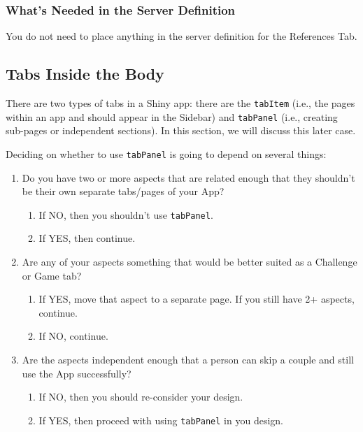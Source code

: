 \documentclass[
]{book}
\providecommand{\tightlist}{%
  \setlength{\itemsep}{0pt}\setlength{\parskip}{0pt}}
\begin{document}
\hypertarget{whats-needed-in-the-server-definition-7}{%
\subsubsection{What's Needed in the Server Definition}\label{whats-needed-in-the-server-definition-7}}

You do not need to place anything in the server definition for the References Tab.

\hypertarget{innerTabsb}{%
\subsection{Tabs Inside the Body}\label{innerTabsb}}

There are two types of tabs in a Shiny app: there are the \texttt{tabItem} (i.e., the pages within an app and should appear in the Sidebar) and \texttt{tabPanel} (i.e., creating sub-pages or independent sections). In this section, we will discuss this later case.

Deciding on whether to use \texttt{tabPanel} is going to depend on several things:

\begin{enumerate}
\def\labelenumi{\arabic{enumi}.}
\tightlist
\item
  Do you have two or more aspects that are related enough that they shouldn't be their own separate tabs/pages of your App?

  \begin{enumerate}
  \def\labelenumii{\alph{enumii}.}
  \tightlist
  \item
    If NO, then you shouldn't use \texttt{tabPanel}.\\
  \item
    If YES, then continue.
  \end{enumerate}
\item
  Are any of your aspects something that would be better suited as a Challenge or Game tab?

  \begin{enumerate}
  \def\labelenumii{\alph{enumii}.}
  \tightlist
  \item
    If YES, move that aspect to a separate page. If you still have 2+ aspects, continue.\\
  \item
    If NO, continue.\\
  \end{enumerate}
\item
  Are the aspects independent enough that a person can skip a couple and still use the App successfully?

  \begin{enumerate}
  \def\labelenumii{\alph{enumii}.}
  \tightlist
  \item
    If NO, then you should re-consider your design.\\
  \item
    If YES, then proceed with using \texttt{tabPanel} in you design.
  \end{enumerate}
\end{enumerate}
\end{document}
